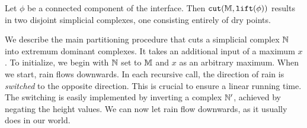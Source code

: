 \begin{claim} \label{clm:cut-int} Let $\phi$ be a connected component of the interface. Then ${\tt cut}(\mathbb{M},{\tt lift}(\phi))$
results in two disjoint simplicial complexes, one consisting entirely of dry points.
\end{claim}


We describe the main partitioning procedure that cuts a simplicial complex $\mathbb{N}$ into extremum
dominant complexes. It takes an additional input of a maximum $x$. To initialize,
we begin with $\mathbb{N}$ set to $\mathbb{M}$ and $x$ as an arbitrary maximum. 
When
we start, rain flows downwards. In each recursive call, the direction of rain is \emph{switched} to the 
opposite direction. This is crucial to ensure a linear running time. 
The switching is easily implemented by inverting a complex $\mathbb{N}'$, achieved by negating the height values.
We can now let rain flow downwards, as it usually does in our world.

